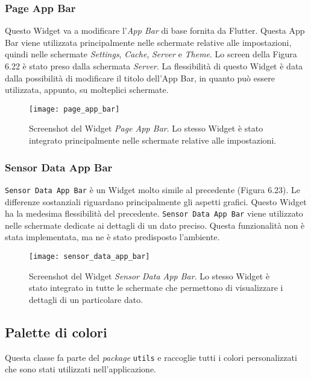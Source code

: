 \newpage

\subsubsection{Page App Bar}
Questo Widget va a modificare l'\textit{App Bar} di base fornita da Flutter. Questa App Bar viene utilizzata principalmente nelle schermate relative alle impostazioni, quindi nelle schermate \textit{Settings}, \textit{Cache}, \textit{Server} e \textit{Theme}. Lo screen della Figura 6.22 è stato preso dalla schermata \textit{Server}. La flessibilità di questo Widget è data dalla possibilità di modificare il titolo dell'App Bar, in quanto può essere utilizzata, appunto, su molteplici schermate.

\begin{figure}
	\begin{center}
		\texttt{[image: page\_app\_bar]}
		\caption[Screenshot - Page App Bar]{Screenshot del Widget \textit{Page App Bar}. Lo stesso Widget è stato integrato principalmente nelle schermate relative alle impostazioni.}
		\label{figura:page_app_bar}
	\end{center}
\end{figure}

\subsubsection{Sensor Data App Bar}
\verb|Sensor Data App Bar| è un Widget molto simile al precedente (Figura 6.23). Le differenze sostanziali riguardano principalmente gli aspetti grafici. Questo Widget ha la medesima flessibilità del precedente. \verb|Sensor Data App Bar| viene utilizzato nelle schermate dedicate ai dettagli di un dato preciso. Questa funzionalità non è stata implementata, ma ne è stato predisposto l'ambiente.

\begin{figure}
	\begin{center}
		\texttt{[image: sensor\_data\_app\_bar]}
		\caption[Screenshot - Sensor Data App Bar]{Screenshot del Widget \textit{Sensor Data App Bar}. Lo stesso Widget è stato integrato in tutte le schermate che permettono di visualizzare i dettagli di un particolare dato.}
		\label{figura:sensor_data_app_bar}
	\end{center}
\end{figure}

\newpage

\subsection{Palette di colori}
Questa classe fa parte del \textit{package} \verb|utils| e raccoglie tutti i colori personalizzati che sono stati utilizzati nell'applicazione.

